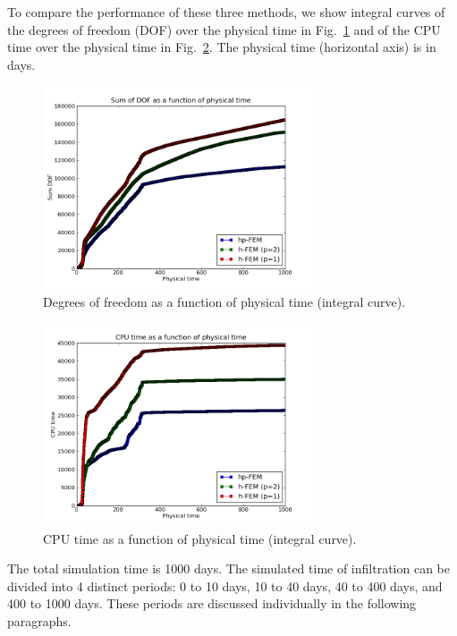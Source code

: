 \documentclass[final,3p,times,twocolumn]{elsarticle}
\begin{document}
To compare the performance of these three methods, we show integral curves 
of the degrees of freedom (DOF) over the physical time in Fig.~\ref{fig:sum-dofs-example3} and 
of the CPU time over the physical time in Fig.~\ref{fig:cpu-time-example3}. The physical time
(horizontal axis) is in days.

\begin{figure}[!htb]
\begin{center}
\includegraphics[height=6cm]{sum-dof-ex3.png}
\end{center}
\vspace{-4mm}
\caption{Degrees of freedom as a function of physical time (integral curve).}
\label{fig:sum-dofs-example3}
\end{figure}


\begin{figure}[!htb]
\begin{center}
\includegraphics[height=6cm]{time-cpu-ex3.png}
\end{center}
\vspace{-4mm}
\caption{CPU time as a function of physical time (integral curve).}
\label{fig:cpu-time-example3}
\end{figure}


The total simulation time is 1000 days. The simulated time of infiltration can be divided 
into 4 distinct periods: 0 to 10 days, 10 to 40 days, 40 to 400 days, and 400 to 1000 days.
These periods are discussed individually in the following paragraphs.
\end{document}
